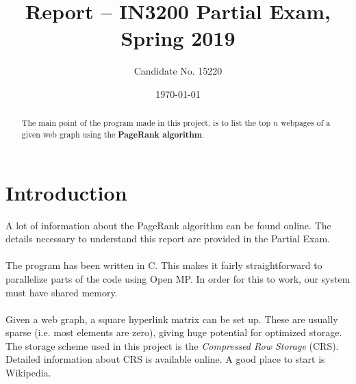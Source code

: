 \documentclass{in1150-innlevering}
\title{Report -- IN3200 Partial Exam, Spring 2019}
\author{Candidate No. 15220}
\date{\today}
\begin{document}
\maketitle
\begin{abstract}
	The main point of the program made in this project, is to list the top $n$ webpages of a given web graph using the \textbf{PageRank algorithm}.
\end{abstract}

\section*{Introduction}
\label{sec:introduction}
	A lot of information about the PageRank algorithm can be found online. The details necessary to understand this report are provided in the Partial Exam.\\
	\\
	The program has been written in C. This makes it fairly straightforward to parallelize parts of the code using Open MP. In order for this to work, our system must have shared memory.\\
	\\
	Given a web graph, a square hyperlink matrix can be set up. These are usually sparse (i.e. most elements are zero), giving huge potential for optimized storage. The storage scheme used in this project is the \emph{Compressed Row Storage} (CRS). Detailed information about CRS is available online. A good place to start is Wikipedia.
\end{document}
